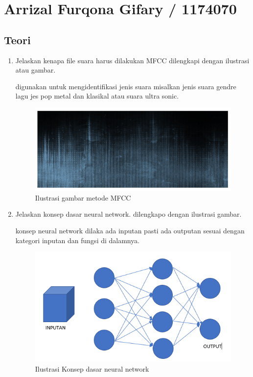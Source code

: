 \section{ Arrizal Furqona Gifary / 1174070}
\subsection{Teori}

\begin{enumerate}

\item Jelaskan kenapa file suara harus dilakukan MFCC dilengkapi dengan ilustrasi atau gambar.\par
digunakan untuk mengidentifikasi jenis suara misalkan jenis suara gendre lagu jes pop metal dan klasikal atau suara ultra sonic.
\begin{figure}[ht]
\centering
\includegraphics[scale=0.5]{figures/1174070/6/1,1.PNG}
\caption{Ilustrasi gambar metode MFCC}
\label{contoh}
\end{figure}


\item Jelaskan konsep dasar neural network. dilengkapo dengan ilustrasi gambar. \par
konsep neural network dilaka ada inputan pasti ada outputan sesuai dengan kategori inputan dan fungsi di dalamnya.
\begin{figure}[ht]
\centering
\includegraphics[scale=0.5]{figures/1174070/6/1,2.PNG}
\caption{Ilustrasi Konsep dasar neural network}
\label{contoh}
\end{figure}



\end{enumerate}
